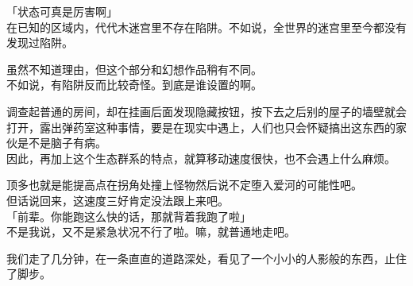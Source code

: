 「状态可真是厉害啊」\\

在已知的区域内，代代木迷宫里不存在陷阱。不如说，全世界的迷宫里至今都没有发现过陷阱。

虽然不知道理由，但这个部分和幻想作品稍有不同。\\

不如说，有陷阱反而比较奇怪。到底是谁设置的啊。

调查起普通的房间，却在挂画后面发现隐藏按钮，按下去之后别的屋子的墙壁就会打开，露出弹药室这种事情，要是在现实中遇上，人们也只会怀疑搞出这东西的家伙是不是脑子有病。\\

因此，再加上这个生态群系的特点，就算移动速度很快，也不会遇上什么麻烦。

顶多也就是能提高点在拐角处撞上怪物然后说不定堕入爱河的可能性吧。\\

但话说回来，这速度三好肯定没法跟上来吧。\\

「前辈。你能跑这么快的话，那就背着我跑了啦」\\

不是我说，又不是紧急状况不行了啦。嘛，就普通地走吧。

我们走了几分钟，在一条直直的道路深处，看见了一个小小的人影般的东西，止住了脚步。\\

